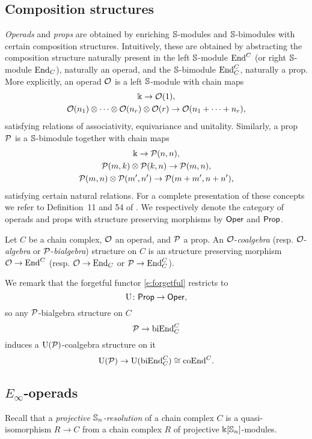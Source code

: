\subsection{Composition structures}

\textit{Operads} and \textit{props} are obtained by enriching $\mathbb{S}$-modules and $\mathbb{S}$-bimodules with certain composition structures.
Intuitively, these are obtained by abstracting the composition structure naturally present in the left $\mathbb{S}$-module $\mathrm{End}^C$ (or right $\mathbb{S}$-module $\mathrm{End}_C$), naturally an operad, and the $\mathbb{S}$-bimodule $\mathrm{End}^C_C$, naturally a prop.
More explicitly, an operad $\mathcal{O}$ is a left $\mathbb{S}$-module with chain maps
\begin{gather*}
	\Bbbk \to \mathcal{O}(1), \\
	\mathcal{O}(n_1) \otimes \dotsb \otimes \mathcal{O}(n_r) \otimes \mathcal{O}(r) \to \mathcal{O}(n_1 + \dots + n_r),
\end{gather*}
satisfying relations of associativity, equivariance and unitality.
Similarly, a prop $\mathcal{P}$ is a $\mathbb{S}$-bimodule together with chain maps
\begin{gather*}
	\Bbbk \to \mathcal{P}(n,n), \\
	\mathcal{P}(m,k) \otimes \mathcal{P}(k,n) \to \mathcal{P}(m,n), \\
	\mathcal{P}(m,n) \otimes \mathcal{P}(m',n') \to \mathcal{P}(m+m',n+n'),
\end{gather*}
satisfying certain natural relations.
For a complete presentation of these concepts we refer to Definition~11 and 54 of \cite{markl2008props}.
We respectively denote the category of operads and props with structure preserving morphisms by $\mathsf{Oper}$ and $\mathsf{Prop}$.

Let $C$ be a chain complex, $\mathcal{O}$ an operad, and $\mathcal{P}$ a prop.
An $\mathcal{O}$-\textit{coalgebra} (resp. $\mathcal{O}$-\textit{algebra} or $\mathcal{P}$-\textit{bialgebra}) structure on $C$ is an structure preserving morphism $\mathcal{O} \to \mathrm{End}^C$ (resp. $\mathcal{O} \to \mathrm{End}_C$ or $\mathcal{P} \to \mathrm{End}_C^C$).

We remark that the forgetful functor \eqref{e:forgetful} restricts to
\[
\operatorname{U} \colon \mathsf{Prop} \to \mathsf{Oper},
\]
so any $\mathcal{P}$-bialgebra structure on $C$
\[
\mathcal{P} \to \mathrm{biEnd}_C^C
\]
induces a $\operatorname{U}(\mathcal{P})$-coalgebra structure on it
\[
\operatorname{U}(\mathcal{P}) \to \operatorname{U}(\mathrm{biEnd}_C^C) \cong \mathrm{coEnd}^C.
\]

\subsection{\texorpdfstring{${E_\infty}$}{E-infty}-operads}

Recall that a \textit{projective $\mathbb{S}_n$-resolution} of a chain complex $C$ is a quasi-isomorphism $R \to C$ from a chain complex $R$ of projective $\Bbbk[\mathbb{S}_n]$-modules.

